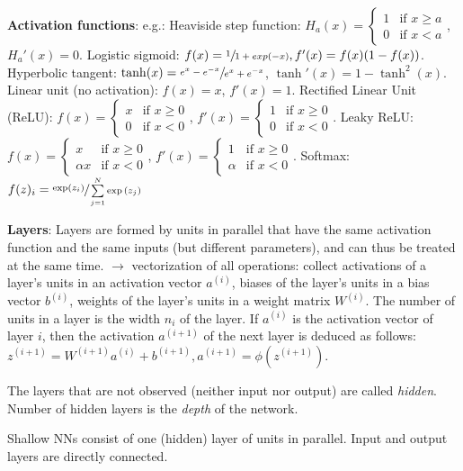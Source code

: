\textbf{Activation functions}: e.g.:
Heaviside step function: 
$H_a (x) = \begin{cases} 
1 & \mbox{if } x \geq a \\
0 & \mbox{if } x < a
\end{cases}$, $H_a' (x) = 0$.
Logistic sigmoid: $f(x) = \sfrac{1}{1+exp(-x)}, f'(x) = f(x)(1-f(x))$.
Hyperbolic tangent: $\tanh(x) = \sfrac{e^x - e^{-x}}{e^x + e^{-x}}$, $\tanh'(x)=1-\tanh^2(x)$.
Linear unit (no activation): $f(x)=x$, $f'(x)=1$.
Rectified Linear Unit (ReLU): $f(x) = \begin{cases} 
x & \mbox{if } x \geq 0 \\
0 & \mbox{if } x < 0
\end{cases}$, $f' (x) = \begin{cases} 
1 & \mbox{if } x \geq 0 \\
0 & \mbox{if } x < 0
\end{cases}$.
Leaky ReLU: $f(x) = \begin{cases} 
x & \mbox{if } x \geq 0 \\
\alpha x & \mbox{if } x < 0
\end{cases}$, $f' (x) = \begin{cases} 
1 & \mbox{if } x \geq 0 \\
\alpha & \mbox{if } x < 0
\end{cases}$.
Softmax: $f(z)_i = \sfrac{\text{exp}(z_i)} {\sum\limits_{j=1}^N {\exp{(z_j)}}}$

\textbf{Layers}: Layers are formed by units in parallel that have the same activation function and the same inputs (but different parameters), 
and can thus be treated at the same time.
$\rightarrow$ vectorization of all operations:
collect activations of a layer’s units in an activation vector $a^{(i)}$, 
biases of the layer’s units in a bias vector $b^{(i)}$,
weights of the layer’s units in a weight matrix $W^{(i)}$.
The number of units in a layer is the width $n_i$ of the layer.
If $a^{(i)}$ is the activation vector of layer $i$, then the activation $a^{(i+1)}$ of the next layer is deduced as follows:
$z^{(i+1)} = W^{(i+1)}a^{(i)} + b^{(i+1)}, a^{(i+1)}=\phi (z^{(i+1)})$.

The layers that are not observed (neither input nor output) are called \textit{hidden}.
Number of hidden layers is the \textit{depth} of the network. %

Shallow NNs consist of one (hidden) layer of units in parallel. 
Input and output layers are directly connected.

